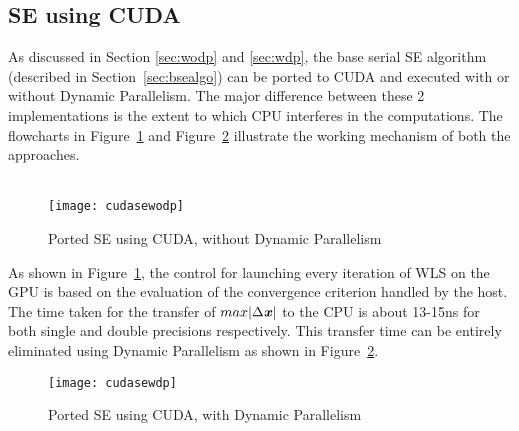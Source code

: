 \documentclass[thesis.tex]{subfiles}
\begin{document}
\subsection{SE using CUDA}
As discussed in Section \ref{sec:wodp} and \ref{sec:wdp}, the base serial SE algorithm (described in Section~\ref{sec:bsealgo}) can be ported to CUDA and executed with or without Dynamic Parallelism. The major difference between these 2 implementations is the extent to which CPU interferes in the computations. The flowcharts in Figure~\ref{fig:cudasewodp} and Figure~\ref{fig:cudasewdp} illustrate the working mechanism of both the approaches.\\\\

\begin{figure}[H]
	\centering
	\texttt{[image: cudasewodp]}
	\caption{Ported SE using CUDA, without Dynamic Parallelism}
	\label{fig:cudasewodp}
\end{figure}

As shown in Figure~\ref{fig:cudasewodp}, the control for launching every iteration of WLS on the GPU is based on the evaluation of the convergence criterion handled by the host. The time taken for the transfer of $max|\Delta \textbf{\textit{x}}|$ to the CPU is about 13-15ns for both single and double precisions respectively. This transfer time can be entirely eliminated using Dynamic Parallelism as shown in Figure~\ref{fig:cudasewdp}.

\begin{figure}[H]
	\centering
	\texttt{[image: cudasewdp]}
	\caption{Ported SE using CUDA, with Dynamic Parallelism}
	\label{fig:cudasewdp}
\end{figure}
\end{document}
